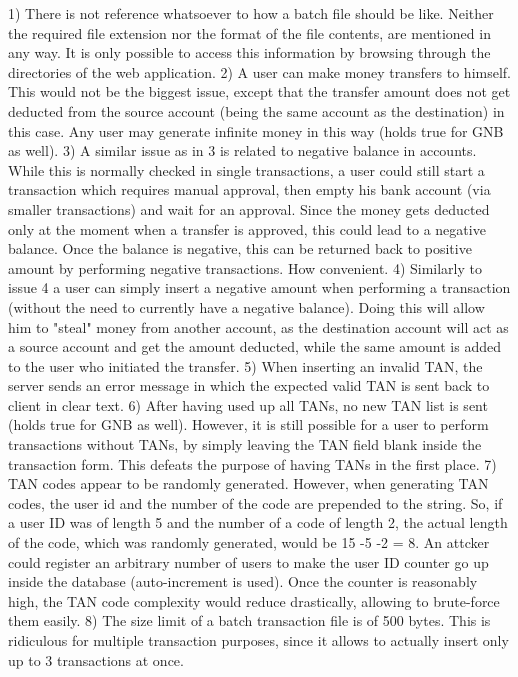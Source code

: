 1) There is not reference whatsoever to how a batch file should be like. Neither the required file extension nor the format of the file contents, are mentioned in any way. It is only possible to access this information by browsing through the directories of the web application.
2) A user can make money transfers to himself. This would not be the biggest issue, except that the transfer amount does not get deducted from the source account (being the same account as the destination) in this case. Any user may generate infinite money in this way (holds true for GNB as well).
3) A similar issue as in {3} is related to negative balance in accounts. While this is normally checked in single transactions, a user could still start a transaction which requires manual approval, then empty his bank account (via smaller transactions) and wait for an approval. Since the money gets deducted only at the moment when a transfer is approved, this could lead to a negative balance. Once the balance is negative, this can be returned back to positive amount by performing negative transactions. How convenient.
4) Similarly to issue {4} a user can simply insert a negative amount when performing a transaction (without the need to currently have a negative balance). Doing this will allow him to "steal" money from another account, as the destination account will act as a source account and get the amount deducted, while the same amount is added to the user who initiated the transfer.
5) When inserting an invalid TAN, the server sends an error message in which the expected valid TAN is sent back to client in clear text.
6) After having used up all TANs, no new TAN list is sent (holds true for GNB as well). However, it is still possible for a user to perform transactions without TANs, by simply leaving the TAN field blank inside the transaction form. This defeats the purpose of having TANs in the first place.
7) TAN codes appear to be randomly generated. However, when generating TAN codes, the user id and the number of the code are prepended to the string. So, if a user ID was of length 5 and the number of a code of length 2, the actual length of the code, which was randomly generated, would be 15 -5 -2 = 8. An attcker could register an arbitrary number of users to make the user ID counter go up inside the database (auto-increment is used). Once the counter is reasonably high, the TAN code complexity would reduce drastically, allowing to brute-force them easily.
8) The size limit of a batch transaction file is of 500 bytes. This is ridiculous for multiple transaction purposes, since it allows to actually insert only up to 3 transactions at once.

